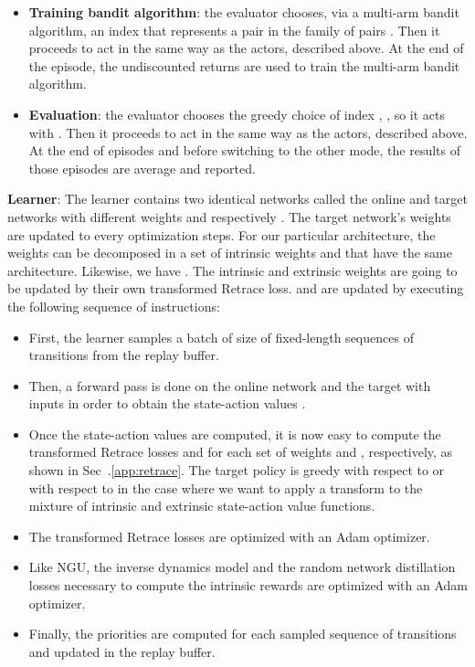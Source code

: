 \documentclass{article}
\begin{document}
\begin{itemize}
    \item \textbf{Training bandit algorithm}: the evaluator chooses, via a multi-arm bandit algorithm, an index  that represents a pair  in the family of pairs . Then it proceeds to act in the same way as the actors, described above. At the end of the episode, the undiscounted returns are used to train the multi-arm bandit algorithm. 
    \item \textbf{Evaluation}: the evaluator chooses the greedy choice of index ,  , so it acts with . Then it proceeds to act in the same way as the actors, described above. At the end of  episodes and before switching to the other mode, the results of those  episodes are average and reported.
\end{itemize}

{\bf Learner}: The learner contains two identical networks called the online and target networks with different weights  and  respectively \cite{mnih2015human}.
The target network's weights  are updated to  every  optimization steps. For our particular architecture, the weights  can be decomposed in a set of intrinsic weights  and  that have the same architecture. Likewise, we have . The intrinsic and extrinsic weights are going to be updated by their own transformed Retrace loss.  and  are updated by executing the following sequence of instructions:
\begin{itemize}
    \item First, the learner samples a batch of size  of fixed-length sequences of transitions  from the replay buffer.
    \item Then, a forward pass is done on the online network and the target with inputs  in order to obtain the state-action values .
    \item Once the state-action values are computed, it is now easy to compute the transformed Retrace losses  and  for each set of weights  and , respectively, as shown in Sec~.\ref{app:retrace}. The target policy  is greedy with respect to  or with respect to  in the case where we want to apply a transform  to the mixture of intrinsic and extrinsic state-action value functions.
    \item The transformed Retrace losses are optimized with an Adam optimizer.
    \item Like NGU, the inverse dynamics model and the random network distillation losses necessary to compute the intrinsic rewards are optimized with an Adam optimizer.
    \item Finally, the priorities are computed for each sampled sequence of transitions  and updated in the replay buffer.
\end{itemize}
\end{document}
